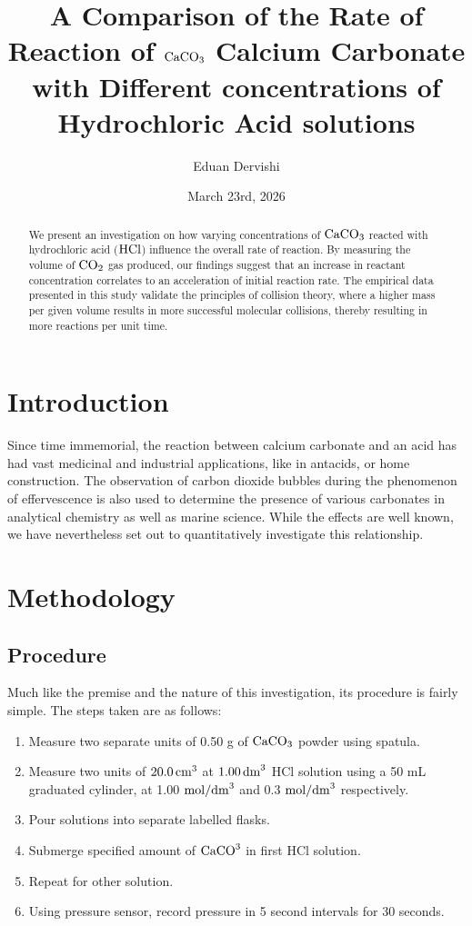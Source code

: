\documentclass{article}
\title{A Comparison of the Rate of Reaction of $\rm{CaCO}_3$ Calcium Carbonate with Different concentrations of Hydrochloric Acid solutions}
\author[1]{Eduan Dervishi}
\affil[1]{\textit{Albanian College Tirana, Tirana, Albania}}
\date{March 23rd, 2026}
\begin{document}
\maketitle
\begin{abstract}
We present an investigation on how varying concentrations of $\rm{CaCO}_3$ reacted with hydrochloric acid ($\rm HCl$) influence the overall rate of reaction. By measuring the volume of $\rm {CO}_2$ gas produced, our findings suggest that an increase in reactant concentration correlates to an acceleration of initial reaction rate. The empirical data presented in this study validate the principles of collision theory, where a higher mass per given volume results in more successful molecular collisions, thereby resulting in more reactions per unit time. 
\end{abstract}
\section{Introduction}
Since time immemorial, the reaction between calcium carbonate and an acid has had vast medicinal and industrial applications, like in antacids, or home construction. The observation of carbon dioxide bubbles during the phenomenon of effervescence is also used to determine the presence of various carbonates in analytical chemistry as well as marine science. While the effects are well known, we have nevertheless set out to quantitatively investigate this relationship. 

\section{Methodology}
\subsection{Procedure}
Much like the premise and the nature of this investigation, its procedure is fairly simple. The steps taken are as follows:

\begin{enumerate}
\item{Measure two separate units of 0.50 g of $\rm{CaCO}_3$ powder using spatula.}

\item{Measure two units of $\rm 20.0\, cm^3$ at $\rm 1.00\, {dm}^3$ HCl solution using a 50 mL graduated cylinder, at 1.00 $\rm mol /{dm}^3$ and 0.3 $\rm mol /{dm}^3$ respectively.}
\item{Pour solutions into separate labelled flasks.}
\item{Submerge specified amount of $\rm{CaCO}^3$ in first HCl solution.}
\item{Repeat for other solution.}
\item{Using pressure sensor, record pressure in 5 second intervals for 30 seconds.}
\end{enumerate}
\end{document}
